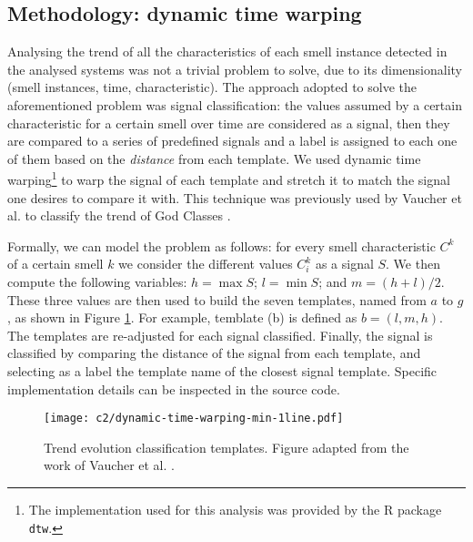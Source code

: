 \subsection{Methodology: dynamic time warping}
Analysing the trend of all the characteristics of each smell instance detected in the analysed systems was not a trivial problem to solve, due to its dimensionality (smell instances, time, characteristic).
The approach adopted to solve the aforementioned problem was signal classification: the values assumed by a certain characteristic for a certain smell over time are considered as a signal, then they are compared to a series of predefined signals and a label is assigned to each one of them based on the \emph{distance} from each template.
We used dynamic time warping\footnote{The implementation used for this analysis was provided by the R package \texttt{dtw}.} \cite{Kruskal1983} to warp the signal of each template and stretch it to match the signal one desires to compare it with. 
This technique was previously used by Vaucher et al. to classify the trend of God Classes \cite{Vaucher2009}.

Formally, we can model the problem as follows: for every smell characteristic $C^{k}$ of a certain smell $k$ we consider the different values $C^{k}_i$ as a signal $S$. We then compute the following variables: $h = \max S$; $l = \min S$; and $m = (h+l)/2$.
These three values are then used to build the seven templates, named from $a$ to $g$, as shown in Figure \ref{c2:fig:classification-templates}. For example, temblate (b) is defined as $b = (l, m, h)$.
The templates are re-adjusted for each signal classified.
Finally, the signal is classified by comparing the distance of the signal from each template, and selecting as a label the template name of the closest signal template. 
Specific implementation details can be inspected in the source code.

\begin{figure}[]
    \centering
    \texttt{[image: c2/dynamic-time-warping-min-1line.pdf]}
    \caption{Trend evolution classification templates. Figure adapted from the work of Vaucher et al. \cite{Vaucher2009}.}\label{c2:fig:classification-templates}
\end{figure}

